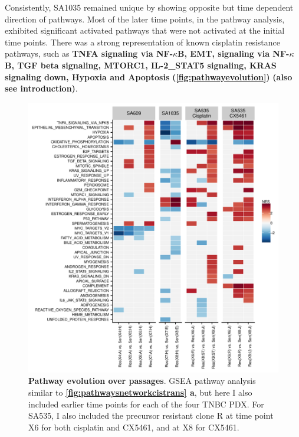 Consistently, SA1035 remained unique by showing opposite but time dependent direction of pathways.
Most of the later time points, in the pathway analysis, exhibited significant activated pathways that were not activated at the initial time points. There was a strong representation of known cisplatin resistance pathways, such as \textbf{TNFA signaling via NF-$\kappa$B, EMT, signaling via NF-$\kappa$B, TGF beta signaling, MTORC1, IL-2\_STAT5 signaling, KRAS signaling down, Hypoxia and Apoptosis} \textbf{(\autoref{fig:pathwayevolution})} \cite{peng2010role, wu2020activation, gutierrez2020role, tao2014oncogenic, galluzzi2012molecular} \textbf{(also see introduction)}. 

\begin{figure}
\centering
 \includegraphics[width=\textwidth]{Figures/chap5/fig17_pathway_evolution.pdf}
\caption[Pathway evolution over passages]
	{\small
	 \textbf{Pathway evolution over passages}. GSEA pathway analysis similar to \textbf{\autoref{fig:pathwaysnetworkcistrans} a}, but here I also included earlier time points for each of the four TNBC PDX. For SA535, I also included the precursor resistant clone R at time point X6 for both cisplatin and CX5461, and at X8 for CX5461.
	 }

	\label{fig:pathwayevolution}
\end{figure}


